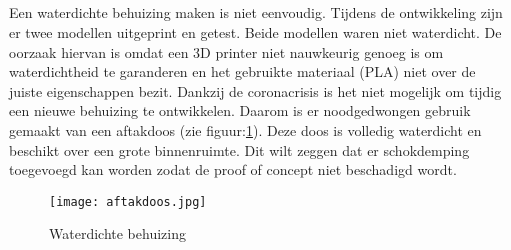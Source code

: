 \subsection{}
Een waterdichte behuizing maken is niet eenvoudig. Tijdens de ontwikkeling zijn er twee modellen uitgeprint en getest. Beide modellen waren niet waterdicht. De oorzaak hiervan is omdat een 3D printer niet nauwkeurig genoeg is om waterdichtheid te garanderen en het gebruikte materiaal (PLA) niet over de juiste eigenschappen bezit. Dankzij de coronacrisis is het niet mogelijk om tijdig een nieuwe behuizing te ontwikkelen. Daarom is er noodgedwongen gebruik gemaakt van een aftakdoos (zie figuur:\ref{fig:case}). Deze doos is volledig waterdicht en beschikt over een grote binnenruimte. Dit wilt zeggen dat er schokdemping toegevoegd kan worden zodat de proof of concept niet beschadigd wordt. 
\begin{figure}
	\texttt{[image: aftakdoos.jpg]}
	\caption{Waterdichte behuizing}
	\label{fig:case}
\end{figure}
\section{}
\label{ch:backend}

